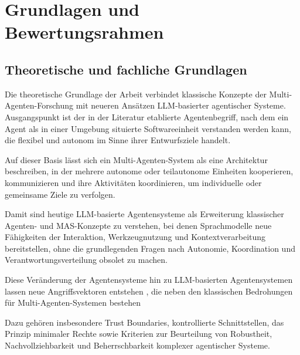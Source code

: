 %

\section{Grundlagen und Bewertungsrahmen}

\subsection{Theoretische und fachliche Grundlagen}

Die theoretische Grundlage der Arbeit verbindet klassische Konzepte der Multi-Agenten-Forschung mit neueren Ansätzen LLM-basierter agentischer Systeme. \cite{wooldridge_intelligent_1995, jennings_roadmap_1998,russell_artificial_2022}
Ausgangspunkt ist der in der Literatur etablierte Agentenbegriff, nach dem ein Agent als in einer Umgebung situierte Softwareeinheit verstanden werden kann, die flexibel und autonom im Sinne ihrer Entwurfsziele handelt. \cite{wooldridge_intelligent_1995, wooldridge_introduction_2002, russell_artificial_2022}

Auf dieser Basis lässt sich ein Multi-Agenten-System als eine Architektur beschreiben, in der mehrere autonome oder teilautonome Einheiten kooperieren, kommunizieren und ihre Aktivitäten koordinieren, um individuelle oder gemeinsame Ziele zu verfolgen. \cite{jennings_roadmap_1998, lesser_retrospective_1991, russell_artificial_2022, botti_agentic_2025}

Damit sind heutige LLM-basierte Agentensysteme als Erweiterung klassischer Agenten- und MAS-Konzepte zu verstehen, bei denen Sprachmodelle neue Fähigkeiten der Interaktion, Werkzeugnutzung und Kontextverarbeitung bereitstellen, ohne die grundlegenden Fragen nach Autonomie, Koordination und Verantwortungsverteilung obsolet zu machen. \cite{botti_agentic_2025,yan_beyond_2025, jennings_roadmap_1998, russell_artificial_2022}

Diese Veränderung der Agentensysteme hin zu LLM-basierten Agentensystemen lassen neue Angriffsvektoren entstehen \cite{tete_threat_2024, krawiecka_extending_2025}, die neben den klassischen Bedrohungen für Multi-Agenten-Systemen bestehen \cite{wong_adding_2000}

Dazu gehören insbesondere Trust Boundaries, kontrollierte Schnittstellen, das Prinzip minimaler Rechte sowie Kriterien zur Beurteilung von Robustheit, Nachvollziehbarkeit und Beherrschbarkeit komplexer agentischer Systeme. \cite{wong_adding_2000, tete_threat_2024}

